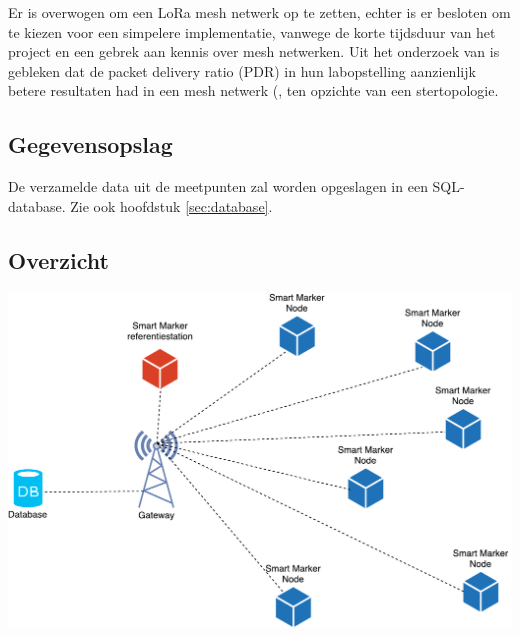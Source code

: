 Er is overwogen om een LoRa mesh netwerk op te zetten, echter is er besloten om te kiezen voor een simpelere implementatie, vanwege de korte tijdsduur van het project en een gebrek aan kennis over mesh netwerken. Uit het onderzoek van \citep{AIM_HI_LORA_WMN} is gebleken dat de packet delivery ratio (PDR) in hun labopstelling aanzienlijk betere resultaten had in een mesh netwerk (, ten opzichte van een stertopologie.

\subsection{Gegevensopslag}
De verzamelde data uit de meetpunten zal worden opgeslagen in een SQL-database.
Zie ook hoofdstuk \ref{sec:database}.

\label{subsec:overzicht}
\subsection{Overzicht}
\includegraphics[width=0.9\linewidth]{technical/system_architecture_overview.pdf}
